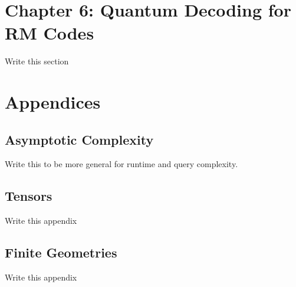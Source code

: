 \documentclass[12pt,twoside]{reedthesis}
\begin{document}
      \section{Chapter 6: Quantum Decoding for RM Codes}
      Write this section
      \section{Appendices}
      	\subsection{Asymptotic Complexity}
      	Write this to be more general for runtime and query complexity.
      	\subsection{Tensors}
      	Write this appendix
      	\subsection{Finite Geometries}
      	Write this appendix



  \backmatter %

    \nocite{*}


%  
 

\end{document}
